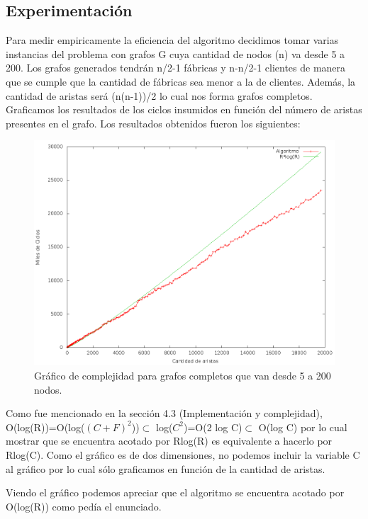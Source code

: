 \subsection{Experimentación}

Para medir empiricamente la eficiencia del algoritmo decidimos tomar varias instancias del problema con grafos G cuya cantidad de nodos (n) va desde 5 a 200. Los grafos generados tendrán n/2-1 fábricas y n-n/2-1 clientes de manera que se cumple que la cantidad de fábricas sea menor a la de clientes. Además, la cantidad de aristas será (n(n-1))/2 lo cual nos forma grafos completos. Graficamos los resultados de los ciclos insumidos en función del número de aristas presentes en el grafo. Los resultados obtenidos fueron los siguientes:

\begin{figure}[H]
\center
\includegraphics[scale=0.40]{ej3/imgs/complejidad.png}
\caption[Long caption]{Gráfico de complejidad para grafos completos que van desde 5 a 200 nodos.}
\label{pic-a}
\end{figure}

Como fue mencionado en la sección 4.3 (Implementación y complejidad), O(log(R))=O(log($(C+F)^2$))$\subset$ log($C^2$)=O(2 log C)$\subset$ O(log C) por lo cual mostrar que se encuentra acotado por Rlog(R) es equivalente a hacerlo por Rlog(C). Como el gráfico es de dos dimensiones, no podemos incluir la variable C al gráfico por lo cual sólo graficamos en función de la cantidad de aristas.

Viendo el gráfico podemos apreciar que el algoritmo se encuentra acotado por O(log(R)) como pedía el enunciado.


